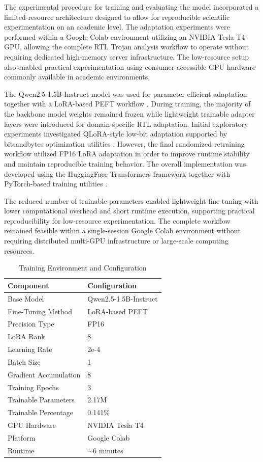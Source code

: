 \documentclass[conference]{IEEEtran}
\begin{document}
The experimental procedure for training and evaluating the model incorporated a limited-resource architecture designed to allow for reproducible scientific experimentation on an academic level. The adaptation experiments were performed within a Google Colab environment utilizing an NVIDIA Tesla T4 GPU, allowing the complete RTL Trojan analysis workflow to operate without requiring dedicated high-memory server infrastructure. The low-resource setup also enabled practical experimentation using consumer-accessible GPU hardware commonly available in academic environments.

The Qwen2.5-1.5B-Instruct model was used for parameter-efficient adaptation together with a LoRA-based PEFT workflow \cite{lora,peft}. During training, the majority of the backbone model weights remained frozen while lightweight trainable adapter layers were introduced for domain-specific RTL adaptation. Initial exploratory experiments investigated QLoRA-style low-bit adaptation supported by bitsandbytes optimization utilities \cite{qlora,bitsandbytes}. However, the final randomized retraining workflow utilized FP16 LoRA adaptation in order to improve runtime stability and maintain reproducible training behavior. The overall implementation was developed using the HuggingFace Transformers framework together with PyTorch-based training utilities \cite{wolf2020transformers,pytorch}.

The reduced number of trainable parameters enabled lightweight fine-tuning with lower computational overhead and short runtime execution, supporting practical reproducibility for low-resource experimentation. The complete workflow remained feasible within a single-session Google Colab environment without requiring distributed multi-GPU infrastructure or large-scale computing resources.

\begin{table}[!t]
\caption{Training Environment and Configuration}
\label{tab:training_environment}
\centering
\begin{tabular}{ll}
\toprule
Component & Configuration \\
\midrule
Base Model & Qwen2.5-1.5B-Instruct \\
Fine-Tuning Method & LoRA-based PEFT \\
Precision Type & FP16 \\
LoRA Rank & 8 \\
Learning Rate & 2e-4 \\
Batch Size & 1 \\
Gradient Accumulation & 8 \\
Training Epochs & 3 \\
Trainable Parameters & 2.17M \\
Trainable Percentage & 0.141\% \\
GPU Hardware & NVIDIA Tesla T4 \\
Platform & Google Colab \\
Runtime & $\sim$6 minutes \\
\bottomrule
\end{tabular}
\end{table}
\end{document}
